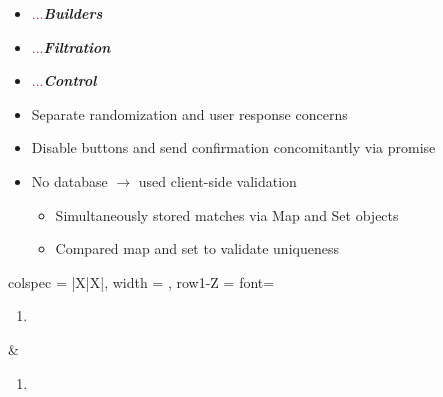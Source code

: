\documentclass[7px]{article}
\begin{document}
\deploy
{
  \begin{itemize}
    \item[] \textcolor{red}{...}\textbf{\textsl{Builders}}
    \item[] \textcolor{red}{...}\textbf{\textsl{Filtration}}
    \item[] \textcolor{red}{...}\textbf{\textsl{Control}}
    \item Separate randomization and user response concerns
    \item Disable buttons and send confirmation concomitantly via promise
    \item No database $\rightarrow$ used client-side validation
      \begin{itemize}
        \item Simultaneously stored matches via Map and Set objects
        \item Compared map and set to validate uniqueness
      \end{itemize}
  \end{itemize}
}
{
 \raggedright
  \begin{tblr}{
      colspec = {|X|X|}, width = \linewidth,
      row{1-Z} = {font=\scriptsize}
    }
    { 
      \begin{enumerate}
        \item 
      \end{enumerate}
    } & {
      \begin{enumerate}
        \item
      \end{enumerate}
    } \\
  \end{tblr}
}
\end{document}
